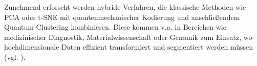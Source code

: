 Zunehmend erforscht werden hybride Verfahren, die klassische Methoden wie PCA oder t-SNE mit quantenmechanischer Kodierung und anschließendem Quantum-Clustering kombinieren. Diese kommen v.a. in Bereichen wie medizinischer Diagnostik, Materialwissenschaft oder Genomik zum Einsatz, wo hochdimensionale Daten effizient transformiert und segmentiert werden müssen (vgl. \cite{gujjuQuantumMachineLearning2024}).



%
